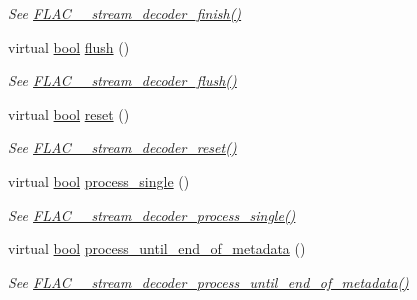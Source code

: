 \begin{DoxyCompactItemize}
\begin{DoxyCompactList}\small\item\em See \hyperlink{group__flac__stream__decoder_gaa51bb38f762ee11b320a0839f165c5ce}{F\+L\+A\+C\+\_\+\+\_\+stream\+\_\+decoder\+\_\+finish()} \end{DoxyCompactList}\item 
virtual \hyperlink{mac_2config_2i386_2lib-src_2libsoxr_2soxr-config_8h_abb452686968e48b67397da5f97445f5b}{bool} \hyperlink{class_f_l_a_c_1_1_decoder_1_1_stream_a8e27385f6a06fe594f46ead0d50c2937}{flush} ()
\begin{DoxyCompactList}\small\item\em See \hyperlink{group__flac__stream__decoder_ga0109ce87f2c648b224b68c08b3c090cb}{F\+L\+A\+C\+\_\+\+\_\+stream\+\_\+decoder\+\_\+flush()} \end{DoxyCompactList}\item 
virtual \hyperlink{mac_2config_2i386_2lib-src_2libsoxr_2soxr-config_8h_abb452686968e48b67397da5f97445f5b}{bool} \hyperlink{class_f_l_a_c_1_1_decoder_1_1_stream_a79ecbf60483e9f31aae7d1e117d4e8e5}{reset} ()
\begin{DoxyCompactList}\small\item\em See \hyperlink{group__flac__stream__decoder_ga2342cf4f3caf9ad20fca1373aaea0c27}{F\+L\+A\+C\+\_\+\+\_\+stream\+\_\+decoder\+\_\+reset()} \end{DoxyCompactList}\item 
virtual \hyperlink{mac_2config_2i386_2lib-src_2libsoxr_2soxr-config_8h_abb452686968e48b67397da5f97445f5b}{bool} \hyperlink{class_f_l_a_c_1_1_decoder_1_1_stream_a6d0d804bca44c0432f3cadfe12e64321}{process\+\_\+single} ()
\begin{DoxyCompactList}\small\item\em See \hyperlink{group__flac__stream__decoder_ga8c4708eb2c5d99595f64dc2473aa2f42}{F\+L\+A\+C\+\_\+\+\_\+stream\+\_\+decoder\+\_\+process\+\_\+single()} \end{DoxyCompactList}\item 
virtual \hyperlink{mac_2config_2i386_2lib-src_2libsoxr_2soxr-config_8h_abb452686968e48b67397da5f97445f5b}{bool} \hyperlink{class_f_l_a_c_1_1_decoder_1_1_stream_a5238e5dfa3f41c2494cc396e22337136}{process\+\_\+until\+\_\+end\+\_\+of\+\_\+metadata} ()
\begin{DoxyCompactList}\small\item\em See \hyperlink{group__flac__stream__decoder_ga5e07ca9bf67dabf2521737f63b2156e2}{F\+L\+A\+C\+\_\+\+\_\+stream\+\_\+decoder\+\_\+process\+\_\+until\+\_\+end\+\_\+of\+\_\+metadata()} \end{DoxyCompactList}\item 

\end{DoxyCompactItemize}
